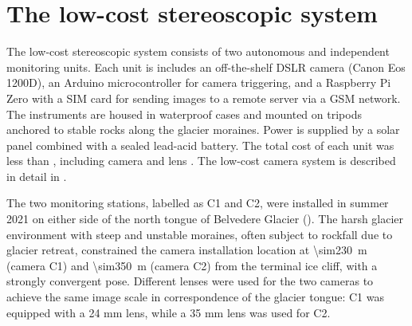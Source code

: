 \section{The low-cost stereoscopic system}\label{sec:4:system}

The low-cost stereoscopic system consists of two autonomous and independent monitoring
units. Each unit is includes an off-the-shelf DSLR camera (Canon Eos 1200D), an Arduino
microcontroller for camera triggering, and a Raspberry Pi
Zero with a SIM card for sending images to a remote server via a GSM
network\citep{ioli2023_replicable}.
The instruments are housed in waterproof cases and mounted on tripods anchored to stable
rocks along the glacier moraines.
Power is supplied by a solar panel combined with a sealed lead-acid battery.
The total cost of each unit was less than , including
camera and lens \citet{ioli2023_replicable}.
The low-cost camera system is described in detail in \citet{ioli2023_replicable}.

The two monitoring stations, labelled as C1 and C2, were installed in summer 2021 on
either side of the north tongue of Belvedere Glacier ().
The harsh glacier environment with steep and unstable moraines, often subject to rockfall
due to glacier retreat, constrained the camera installation location at
\SI{\sim230}{\meter} (camera C1) and \SI{\sim350}{\meter} (camera C2) from the terminal
ice cliff, with a strongly convergent pose.
Different lenses were used for the two cameras to achieve the same image scale in
correspondence of the glacier tongue: C1 was equipped with a 24 mm lens, while a 35 mm
lens was used for C2.

